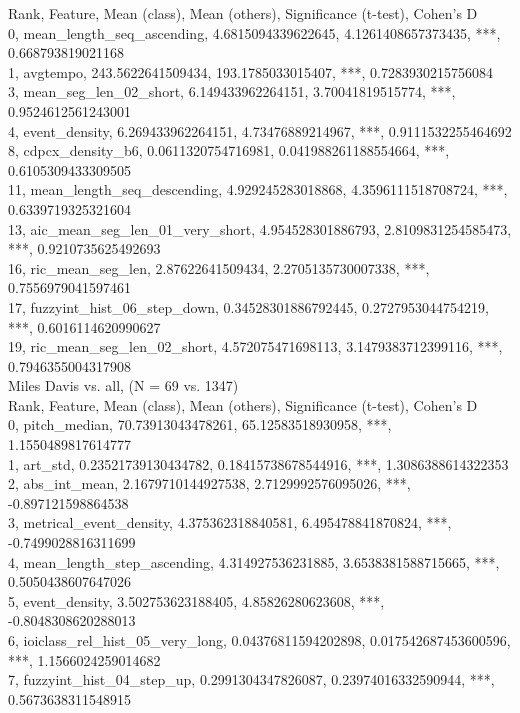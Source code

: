 Rank, Feature, Mean (class), Mean (others), Significance (t-test), Cohen's D\\
0, mean_length_seq_ascending, 4.6815094339622645, 4.1261408657373435, ***, 0.668793819021168\\
1, avgtempo, 243.5622641509434, 193.1785033015407, ***, 0.7283930215756084\\
3, mean_seg_len_02_short, 6.149433962264151, 3.70041819515774, ***, 0.9524612561243001\\
4, event_density, 6.269433962264151, 4.73476889214967, ***, 0.9111532255464692\\
8, cdpcx_density_b6, 0.0611320754716981, 0.041988261188554664, ***, 0.6105309433309505\\
11, mean_length_seq_descending, 4.929245283018868, 4.3596111518708724, ***, 0.6339719325321604\\
13, aic_mean_seg_len_01_very_short, 4.954528301886793, 2.8109831254585473, ***, 0.9210735625492693\\
16, ric_mean_seg_len, 2.87622641509434, 2.2705135730007338, ***, 0.7556979041597461\\
17, fuzzyint_hist_06_step_down, 0.34528301886792445, 0.2727953044754219, ***, 0.6016114620990627\\
19, ric_mean_seg_len_02_short, 4.572075471698113, 3.1479383712399116, ***, 0.7946355004317908\\
Miles Davis vs. all, (N = 69 vs. 1347)\\
Rank, Feature, Mean (class), Mean (others), Significance (t-test), Cohen's D\\
0, pitch_median, 70.73913043478261, 65.12583518930958, ***, 1.1550489817614777\\
1, art_std, 0.23521739130434782, 0.18415738678544916, ***, 1.3086388614322353\\
2, abs_int_mean, 2.1679710144927538, 2.7129992576095026, ***, -0.897121598864538\\
3, metrical_event_density, 4.375362318840581, 6.495478841870824, ***, -0.7499028816311699\\
4, mean_length_step_ascending, 4.314927536231885, 3.6538381588715665, ***, 0.5050438607647026\\
5, event_density, 3.502753623188405, 4.85826280623608, ***, -0.8048308620288013\\
6, ioiclass_rel_hist_05_very_long, 0.04376811594202898, 0.017542687453600596, ***, 1.1566024259014682\\
7, fuzzyint_hist_04_step_up, 0.2991304347826087, 0.23974016332590944, ***, 0.5673638311548915\\
